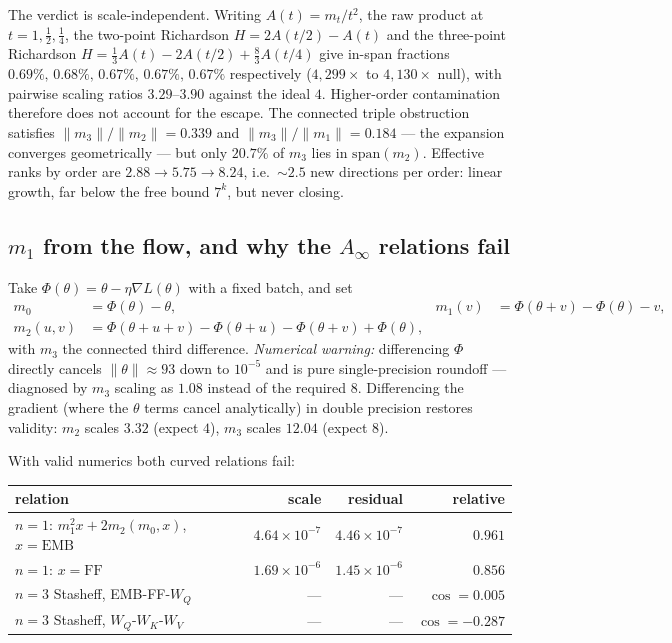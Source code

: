 The verdict is scale-independent. Writing $A(t)=m_t/t^2$, the raw product at
$t=1,\tfrac12,\tfrac14$, the two-point Richardson $H=2A(t/2)-A(t)$ and the
three-point Richardson $H=\tfrac13A(t)-2A(t/2)+\tfrac83A(t/4)$ give in-span
fractions $0.69\%,\,0.68\%,\,0.67\%,\,0.67\%,\,0.67\%$ respectively
($4{,}299\times$ to $4{,}130\times$ null), with pairwise scaling ratios
$3.29$--$3.90$ against the ideal $4$. Higher-order contamination therefore does
not account for the escape. The connected triple obstruction
satisfies $\|m_3\|/\|m_2\| = 0.339$ and $\|m_3\|/\|m_1\| = 0.184$ --- the
expansion converges geometrically --- but only $20.7\%$ of $m_3$ lies in
$\mathrm{span}(m_2)$. Effective ranks by order are
$2.88 \to 5.75 \to 8.24$, i.e.\ $\sim\!2.5$ new directions per order: linear
growth, far below the free bound $7^k$, but never closing.

\subsection{\texorpdfstring{$m_1$}{m1} from the flow, and why the
\texorpdfstring{$A_\infty$}{A-infinity} relations fail}

Take $\Phi(\theta) = \theta - \eta\nabla L(\theta)$ with a fixed batch, and set
\begin{align}
  m_0 &= \Phi(\theta)-\theta, &
  m_1(v) &= \Phi(\theta+v)-\Phi(\theta)-v, \\
  m_2(u,v) &= \Phi(\theta{+}u{+}v)-\Phi(\theta{+}u)-\Phi(\theta{+}v)+\Phi(\theta),
  \nonumber
\end{align}
with $m_3$ the connected third difference. \emph{Numerical warning:}
differencing $\Phi$ directly cancels $\|\theta\|\approx 93$ down to $10^{-5}$
and is pure single-precision roundoff --- diagnosed by $m_3$ scaling as $1.08$
instead of the required $8$. Differencing the gradient (where the $\theta$
terms cancel analytically) in double precision restores validity: $m_2$ scales
$3.32$ (expect $4$), $m_3$ scales $12.04$ (expect $8$).

With valid numerics both curved relations fail:
\begin{center}
\begin{tabular}{lrrr}
\toprule
relation & scale & residual & relative \\
\midrule
$n{=}1$: $m_1^2x + 2m_2(m_0,x)$, $x=\mathrm{EMB}$ & $4.64{\times}10^{-7}$ & $4.46{\times}10^{-7}$ & $0.961$ \\
$n{=}1$: $x=\mathrm{FF}$ & $1.69{\times}10^{-6}$ & $1.45{\times}10^{-6}$ & $0.856$ \\
$n{=}3$ Stasheff, EMB-FF-$W_Q$ & --- & --- & $\cos = 0.005$ \\
$n{=}3$ Stasheff, $W_Q$-$W_K$-$W_V$ & --- & --- & $\cos = -0.287$ \\
\bottomrule
\end{tabular}
\end{center}

